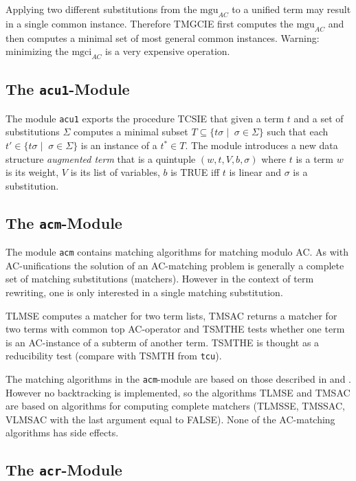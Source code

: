 Applying two different substitutions from the $\mbox{mgu}_{AC}$ to a unified
term may result in a single common instance.
Therefore TMGCIE first computes the $\mbox{mgu}_{AC}$ and then computes a
minimal set of most general common instances.
Warning: minimizing the $\mbox{mgci}_{AC}$ is a very expensive operation.

\subsection{The {\tt acu1}-Module}

The module {\tt acu1} exports the procedure TCSIE that given a term
$t$ and a set of substitutions $\Sigma$ computes a minimal subset
\( T \subseteq \{ t\sigma \mid \; \sigma \in \Sigma \} \) such that
each \( t' \in \{ t\sigma \mid \; \sigma \in \Sigma \} \) is an instance of
a \( t^* \in T \).
The module introduces a new data structure {\em augmented term}
that is a quintuple $(w,t,V,b,\sigma)$ where $t$ is a term $w$ is its
weight, $V$ is its list of variables, $b$ is TRUE iff $t$ is linear and
$\sigma$ is a substitution.

\subsection{The {\tt acm}-Module}

The module {\tt acm} contains matching algorithms for matching modulo AC.
As with AC-unifications the solution of an AC-matching problem is generally 
a complete set of matching substitutions (matchers).
However in the context of term rewriting, one is only interested in a single
matching substitution.
 
TLMSE computes a matcher for two term lists, TMSAC returns a matcher for two
terms with common top AC-operator and TSMTHE tests whether one term is an
AC-instance of a subterm of another term.
TSMTHE is thought as a reducibility test (compare with TSMTH from {\tt tcu}).

The matching algorithms in the {\tt acm}-module are based on those 
described in \cite{Hullot:79} and \cite{KuechlinLeitsch:88}.
However no backtracking is implemented, so the algorithms
TLMSE and TMSAC are based on algorithms for computing complete matchers
(TLMSSE, TMSSAC, VLMSAC with the last argument equal to FALSE).
None of the AC-matching algorithms has side effects.

\subsection{The {\tt acr}-Module}


